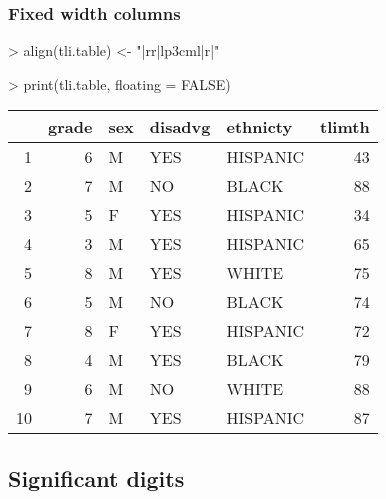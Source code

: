 \documentclass[letterpaper]{article}
\begin{document}
\subsubsection{Fixed width columns}
\begin{Schunk}
\begin{Sinput}
> align(tli.table) <- "|rr|lp{3cm}l|r|"
\end{Sinput}
\end{Schunk}
\begin{Schunk}
\begin{Sinput}
> print(tli.table, floating = FALSE)
\end{Sinput}
% latex table generated in R 2.6.0 by xtable 1.5-2 package
% Wed Oct 10 14:26:37 2007
\begin{tabular}{|rr|lp{3cm}l|r|}
  \hline
 & grade & sex & disadvg & ethnicty & tlimth \\
  \hline
1 &   6 & M & YES & HISPANIC &  43 \\
  2 &   7 & M & NO & BLACK &  88 \\
  3 &   5 & F & YES & HISPANIC &  34 \\
  4 &   3 & M & YES & HISPANIC &  65 \\
  5 &   8 & M & YES & WHITE &  75 \\
  6 &   5 & M & NO & BLACK &  74 \\
  7 &   8 & F & YES & HISPANIC &  72 \\
  8 &   4 & M & YES & BLACK &  79 \\
  9 &   6 & M & NO & WHITE &  88 \\
  10 &   7 & M & YES & HISPANIC &  87 \\
   \hline
\end{tabular}\end{Schunk}

\subsection{Significant digits}
\end{document}
